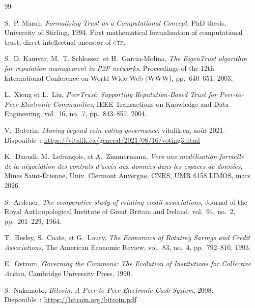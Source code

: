 \documentclass[12pt,a4paper]{article}
\theoremstyle{definition}
\theoremstyle{plain}
\theoremstyle{remark}
\newcommand{\CTP}{\textsc{ctp}}
\newcommand{\1}{\mathbf{1}}
\begin{document}
\begin{thebibliography}{99}

S.~P. Marsh,
\textit{Formalising Trust as a Computational Concept},
PhD thesis, University of Stirling, 1994.
First mathematical formalization of computational trust;
direct intellectual ancestor of \CTP{}.

S.~D. Kamvar, M.~T. Schlosser, et H.~Garcia-Molina,
\textit{The EigenTrust algorithm for reputation management in P2P networks},
Proceedings of the 12th International Conference on World Wide Web (WWW),
pp.~640--651, 2003.

L.~Xiong et L.~Liu,
\textit{PeerTrust: Supporting Reputation-Based Trust for Peer-to-Peer Electronic Communities},
IEEE Transactions on Knowledge and Data Engineering,
vol.~16, no.~7, pp.~843--857, 2004.

V.~Buterin,
\textit{Moving beyond coin voting governance},
vitalik.ca, août 2021.
Disponible~: \url{https://vitalik.ca/general/2021/08/16/voting3.html}

K.~Daoudi, M.~Lefrançois, et A.~Zimmermann,
\textit{Vers une modélisation formelle de la négociation des contrats d'accès
aux données dans les espaces de données},
Mines Saint-Étienne, Univ. Clermont Auvergne, CNRS, UMR 6158 LIMOS,
mars 2026.

S.~Ardener,
\textit{The comparative study of rotating credit associations},
Journal of the Royal Anthropological Institute of Great Britain and Ireland,
vol.~94, no.~2, pp.~201--229, 1964.

T.~Besley, S.~Coate, et G.~Loury,
\textit{The Economics of Rotating Savings and Credit Associations},
The American Economic Review,
vol.~83, no.~4, pp.~792--810, 1993.

E.~Ostrom,
\textit{Governing the Commons: The Evolution of Institutions for Collective Action},
Cambridge University Press, 1990.

S.~Nakamoto,
\textit{Bitcoin: A Peer-to-Peer Electronic Cash System},
2008.
Disponible~: \url{https://bitcoin.org/bitcoin.pdf}

\end{thebibliography}
\end{document}
